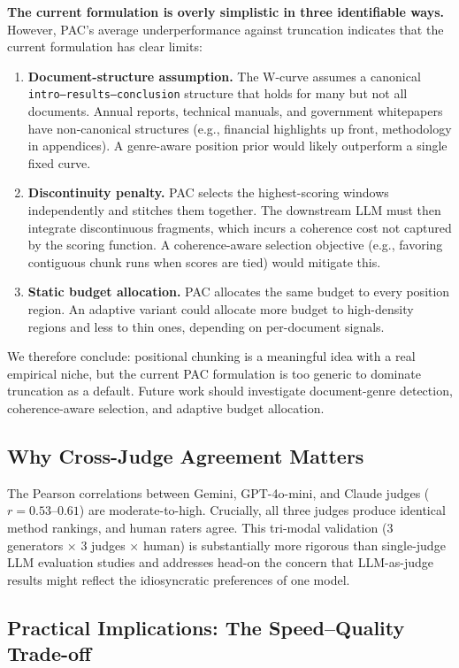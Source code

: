 \documentclass[journal]{IEEEtran}
\begin{document}
\textbf{The current formulation is overly simplistic in three identifiable ways.} However, PAC's average underperformance against truncation indicates that the current formulation has clear limits:
\begin{enumerate}
    \item \textbf{Document-structure assumption.} The W-curve assumes a canonical \texttt{intro--results--conclusion} structure that holds for many but not all documents. Annual reports, technical manuals, and government whitepapers have non-canonical structures (e.g., financial highlights up front, methodology in appendices). A genre-aware position prior would likely outperform a single fixed curve.
    \item \textbf{Discontinuity penalty.} PAC selects the highest-scoring windows independently and stitches them together. The downstream LLM must then integrate discontinuous fragments, which incurs a coherence cost not captured by the scoring function. A coherence-aware selection objective (e.g., favoring contiguous chunk runs when scores are tied) would mitigate this.
    \item \textbf{Static budget allocation.} PAC allocates the same budget to every position region. An adaptive variant could allocate more budget to high-density regions and less to thin ones, depending on per-document signals.
\end{enumerate}

We therefore conclude: positional chunking is a meaningful idea with a real empirical niche, but the current PAC formulation is too generic to dominate truncation as a default. Future work should investigate document-genre detection, coherence-aware selection, and adaptive budget allocation.

\subsection{Why Cross-Judge Agreement Matters}

The Pearson correlations between Gemini, GPT-4o-mini, and Claude judges ($r = 0.53$--$0.61$) are moderate-to-high. Crucially, all three judges produce identical method rankings, and human raters agree. This tri-modal validation (3 generators $\times$ 3 judges $\times$ human) is substantially more rigorous than single-judge LLM evaluation studies and addresses head-on the concern that LLM-as-judge results might reflect the idiosyncratic preferences of one model.

\subsection{Practical Implications: The Speed--Quality Trade-off}
\label{sec:speed-discussion}
\end{document}
